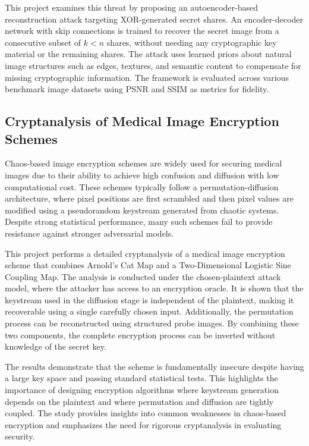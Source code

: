 This project examines this threat by proposing an autoencoder-based reconstruction attack targeting XOR-generated secret shares. An encoder-decoder network with skip connections is trained to recover the secret image from a consecutive subset of $k < n$ shares, without needing any cryptographic key material or the remaining shares. The attack uses learned priors about natural image structures such as edges, textures, and semantic content to compensate for missing cryptographic information. The framework is evaluated across various benchmark image datasets using PSNR and SSIM as metrics for fidelity.

\subsection{Cryptanalysis of Medical Image Encryption Schemes}

Chaos-based image encryption schemes are widely used for securing medical images due to their ability to achieve high confusion and diffusion with low computational cost. These schemes typically follow a permutation-diffusion architecture, where pixel positions are first scrambled and then pixel values are modified using a pseudorandom keystream generated from chaotic systems. Despite strong statistical performance, many such schemes fail to provide resistance against stronger adversarial models.

This project performs a detailed cryptanalysis of a medical image encryption scheme that combines Arnold's Cat Map and a Two-Dimensional Logistic Sine Coupling Map. The analysis is conducted under the chosen-plaintext attack model, where the attacker has access to an encryption oracle. It is shown that the keystream used in the diffusion stage is independent of the plaintext, making it recoverable using a single carefully chosen input. Additionally, the permutation process can be reconstructed using structured probe images. By combining these two components, the complete encryption process can be inverted without knowledge of the secret key.

The results demonstrate that the scheme is fundamentally insecure despite having a large key space and passing standard statistical tests. This highlights the importance of designing encryption algorithms where keystream generation depends on the plaintext and where permutation and diffusion are tightly coupled. The study provides insights into common weaknesses in chaos-based encryption and emphasizes the need for rigorous cryptanalysis in evaluating security.